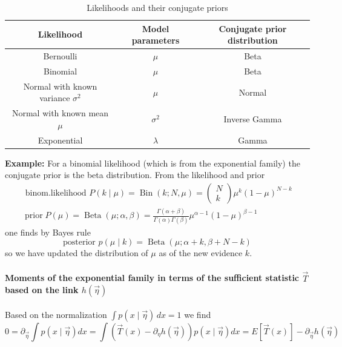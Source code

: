 \begin{table}[!htb]
    \centering
    \begin{tabular}{|c|c|c|}
    \hline
    \textbf{Likelihood} & \textbf{Model parameters} & \textbf{Conjugate prior distribution} \\ \hline
    Bernoulli & $\mu$ & Beta \\ \hline
    Binomial & $\mu$ & Beta \\ \hline
    Normal with known variance $\sigma^2$ & $\mu$ & Normal \\ \hline
    Normal with known mean $\mu$ & $\sigma^2$ & Inverse Gamma \\ \hline
    Exponential & $\lambda$ & Gamma \\ \hline
    \end{tabular}
    \caption{Likelihoods and their conjugate priors}
    \label{tab:conjugate_priors}
\end{table}

\textbf{Example:} For a binomial likelihood (which is from the exponential family) the conjugate prior is the beta distribution.
From the likelihood and prior
\begin{equation}
    \begin{gathered}
        \text { binom.likelihood } P(k \mid \mu)=\operatorname{Bin}(k ; N, \mu)=\left(\begin{array}{c}
            N \\
            k
            \end{array}\right) \mu^k(1-\mu)^{N-k} \\
            \operatorname{prior} P(\mu)=\operatorname{Beta}(\mu ; \alpha, \beta)=\frac{\Gamma(\alpha+\beta)}{\Gamma(\alpha) \Gamma(\beta)} \mu^{\alpha-1}(1-\mu)^{\beta-1}
    \end{gathered}
\end{equation}
one finds by Bayes rule
\begin{equation}
    \text{posterior } p(\mu \mid k) = \operatorname{Beta}(\mu ; \alpha+k, \beta+N-k)
\end{equation}
so we have updated the distribution of $\mu$ as of the new evidence $k$.

\paragraph*{Moments of the exponential family in terms of the sufficient statistic $\vec{T}$ based on the link $h(\vec{\eta})$} 
Based on the normalization $\int p(x \mid \vec{\eta}) \, dx = 1$ we find
\begin{equation}
    0=\partial_{\vec{\eta}} \int p(x \mid \vec{\eta}) d x=\int\left(\vec{T}(x)-\partial_\eta h(\vec{\eta})\right) p(x \mid \vec{\eta}) d x=E[\vec{T}(x)]-\partial_\vec{\eta} h(\vec{\eta})
\end{equation}

